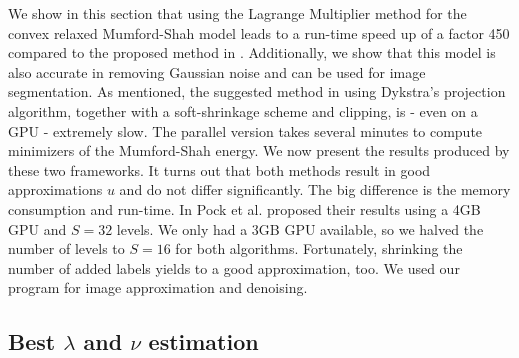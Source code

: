 \documentclass[abstracton]{scrreprt}
\begin{document}
        We show in this section that using the Lagrange Multiplier method for the convex relaxed Mumford-Shah model leads to a run-time speed up of a factor 450 compared to the proposed method in \cite{Pock-et-al-iccv09}. Additionally, we show that this model is also accurate in removing Gaussian noise and can be used for image segmentation. As mentioned, the suggested method in \cite{Pock-et-al-iccv09} using Dykstra's projection algorithm, together with a soft-shrinkage scheme and clipping, is - even on a GPU - extremely slow. The parallel version takes several minutes to compute minimizers of the Mumford-Shah energy. We now present the results produced by these two frameworks. It turns out that both methods result in good approximations $u$ and do not differ significantly. The big difference is the memory consumption and run-time. In \cite{Pock-et-al-iccv09} Pock et al. proposed their results using a 4GB GPU and $S = 32$ levels. We only had a 3GB GPU available, so we halved the number of levels to $S = 16$ for both algorithms. Fortunately, shrinking the number of added labels yields to a good approximation, too. We used our program for image approximation and denoising.

        \subsection{Best $\lambda$ and $\nu$ estimation} %
        \label{sub:best_lambda_and_nu_estimation}
\end{document}
